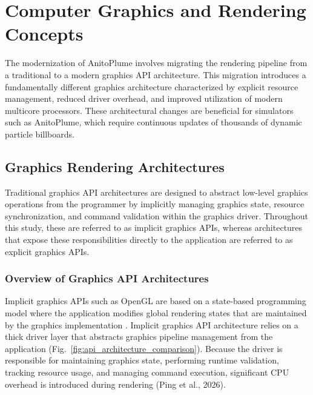 %
%
%                 

\chapter{Computer Graphics and Rendering Concepts}
\label{sec:theoframework}

The modernization of AnitoPlume involves migrating the rendering pipeline from a traditional to a modern graphics API architecture. 
This migration introduces a fundamentally different graphics architecture characterized by explicit resource management, reduced driver overhead, and improved utilization of modern multicore processors.
These architectural changes are beneficial for simulators such as AnitoPlume, which require continuous updates of thousands of dynamic particle billboards.

\section{Graphics Rendering Architectures}
Traditional graphics API architectures are designed to abstract low-level graphics operations from the programmer by implicitly managing graphics state, resource synchronization, and command validation within the graphics driver.
Throughout this study, these are referred to as implicit graphics APIs, whereas architectures that expose these responsibilities directly to the application are referred to as explicit graphics APIs.

\subsection{Overview of Graphics API Architectures}
Implicit graphics APIs such as OpenGL are based on a state-based programming model where the application modifies global rendering states that are maintained by the graphics implementation \cite{opengl46spec2022}.
Implicit graphics API architecture relies on a thick driver layer that abstracts graphics pipeline management from the application (Fig.~\ref{fig:api_architecture_comparison}).
Because the driver is responsible for maintaining graphics state, performing runtime validation, tracking resource usage, and managing command execution, significant CPU overhead is introduced during rendering (Ping et al., 2026).

